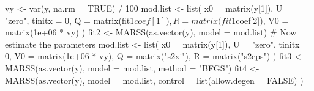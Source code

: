 \begin{Schunk}
\begin{Sinput}
 vy <- var(y, na.rm = TRUE) / 100
 mod.list <- list(
   x0 = matrix(y[1]), U = "zero", tinitx = 0,
   Q = matrix(fit1$coef[1]), R = matrix(fit1$coef[2]),
   V0 = matrix(1e+06 * vy)
 )
 fit2 <- MARSS(as.vector(y), model = mod.list)
 # Now estimate the parameters
 mod.list <- list(
   x0 = matrix(y[1]), U = "zero", tinitx = 0, V0 = matrix(1e+06 * vy),
   Q = matrix("s2xi"), R = matrix("s2eps")
 )
 fit3 <- MARSS(as.vector(y), model = mod.list, method = "BFGS")
 fit4 <- MARSS(as.vector(y),
   model = mod.list,
   control = list(allow.degen = FALSE)
 )
\end{Sinput}
\end{Schunk}
